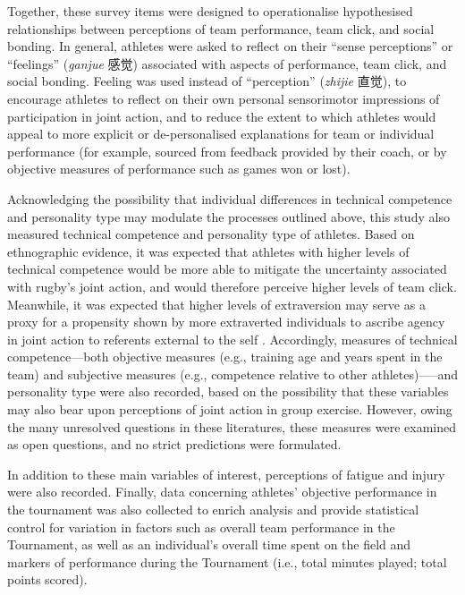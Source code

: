 \begin{CJK}{UTF8}{gbsn}
Together, these survey items were designed to operationalise hypothesised relationships between perceptions of team performance, team click, and social bonding.  In general, athletes were asked to reflect on their ``sense perceptions'' or ``feelings'' (\textit{ganjue} 感觉) associated with aspects of performance, team click, and social bonding.  Feeling was used instead of ``perception'' (\textit{zhijie} 直觉), to encourage athletes to reflect on their own personal sensorimotor impressions of participation in joint action, and to reduce the extent to which athletes would appeal to more explicit or de-personalised explanations for team or individual performance (for example, sourced from feedback provided by their coach, or by objective measures of performance such as games won or lost).

Acknowledging the possibility that individual differences in technical competence and personality type may modulate the processes outlined above, this study also measured technical competence and personality type of athletes.  Based on ethnographic evidence, it was expected that athletes with higher levels of technical competence would be more able to mitigate the uncertainty associated with rugby’s joint action, and would therefore perceive higher levels of team click.  Meanwhile, it was expected that higher levels of extraversion may serve as a proxy for a propensity shown by more extraverted individuals to ascribe agency in joint action to referents external to the self \citep[]{Keller2014}.  Accordingly, measures of technical competence---both objective measures (e.g., training age and years spent in the team) and subjective measures (e.g., competence relative to other athletes)—--and personality type were also recorded, based on the possibility that these variables may also bear upon perceptions of joint action in group exercise.   However, owing the many unresolved questions in these literatures, these measures were examined as open questions, and no strict predictions were formulated.

In addition to these main variables of interest, perceptions of fatigue and injury were also recorded.  Finally, data concerning athletes' objective performance in the tournament was also collected to enrich analysis and provide statistical control for variation in factors such as overall team performance in the Tournament, as well as an individual's overall time spent on the field and markers of performance during the Tournament (i.e., total minutes played; total points scored).


\end{CJK}
